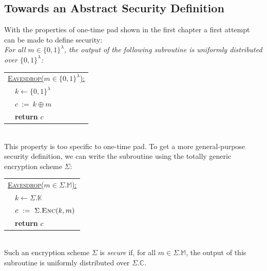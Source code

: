 \documentclass{article}
\begin{document}
\begin{adjustwidth}{2em}{}
			\subsection{Towards an Abstract Security Definition}
			\begin{adjustwidth}{2em}{4em}
				With the properties of one-time pad shown in the first chapter a first attempt can be made to define security: \\
				\textit{For all $m \in \{ 0,1 \}^{\lambda}$, the output of the following subroutine is uniformly distributed over $\{ 0,1 \}^{\lambda}$:}
				\begin{center}
					\begin{tabular}{|l|}
						\hline
						\underline{\textsc{Eavesdrop}($m \in \{ 0,1 \}^{\lambda}$):} \\
						\ \ $k \leftarrow \{ 0,1 \}^{\lambda}$ \\
						\ \ $c \ := \ k \oplus m$ \\
						\ \ \textbf{return} $c$ \\
						\hline
					\end{tabular}
				\end{center}
				\hfill \\
				This property is too specific to one-time pad. To get a more general-purpose security definition, we can write the subroutine using the totally generic encryption scheme $\Sigma$: \\
				\begin{center}
					\begin{tabular}{|l|}
						\hline
						\underline{\textsc{Eavesdrop}($m \in \Sigma.\mathbb{M}$):} \\
						\ \ $k \leftarrow \Sigma.\mathbb{K}$ \\
						\ \ $c \ := \ \Sigma.\textsc{Enc}(k,m)$ \\
						\ \ \textbf{return} $c$ \\
						\hline
					\end{tabular}
				\end{center}
				\hfill \\
				Such an encryption scheme $\Sigma$ is \textit{secure} if, for all $m \in \Sigma.\mathbb{M}$, the output of this subroutine is uniformly distributed over $\Sigma.\mathbb{C}$. 

\end{adjustwidth}
\end{adjustwidth}
\end{document}
